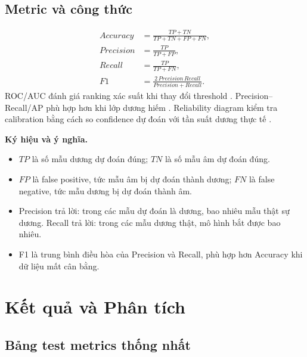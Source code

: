 \documentclass[12pt,a4paper]{article}
\begin{document}
\subsection{Metric và công thức}

\begin{align}
 Accuracy &= \frac{TP+TN}{TP+TN+FP+FN}, \\
 Precision &= \frac{TP}{TP+FP}, \\
 Recall &= \frac{TP}{TP+FN}, \\
 F1 &= \frac{2\,Precision\,Recall}{Precision+Recall}.
\end{align}
ROC/AUC đánh giá ranking xác suất khi thay đổi threshold \cite{fawcett2006}. Precision--Recall/AP phù hợp hơn khi lớp dương hiếm \cite{davis2006}. Reliability diagram kiểm tra calibration bằng cách so confidence dự đoán với tần suất dương thực tế \cite{niculescu2005}.

\textbf{Ký hiệu và ý nghĩa.}
\begin{itemize}
  \item $TP$ là số mẫu dương dự đoán đúng; $TN$ là số mẫu âm dự đoán đúng.
  \item $FP$ là false positive, tức mẫu âm bị dự đoán thành dương; $FN$ là false negative, tức mẫu dương bị dự đoán thành âm.
  \item Precision trả lời: trong các mẫu dự đoán là dương, bao nhiêu mẫu thật sự dương. Recall trả lời: trong các mẫu dương thật, mô hình bắt được bao nhiêu.
  \item F1 là trung bình điều hòa của Precision và Recall, phù hợp hơn Accuracy khi dữ liệu mất cân bằng.
\end{itemize}

\section{Kết quả và Phân tích}

\subsection{Bảng test metrics thống nhất}
\end{document}
